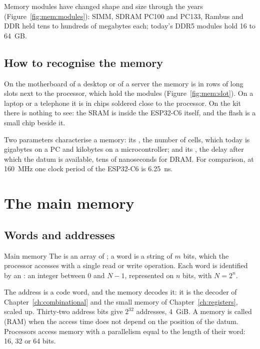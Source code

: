 Memory modules have changed shape and size through the years
(Figure~\ref{fig:mem:modules}): SIMM, SDRAM PC100 and PC133, Rambus and DDR
held tens to hundreds of megabytes each; today's DDR5 modules hold 16 to
64~GB.

\subsection{How to recognise the memory}

On the motherboard of a desktop or of a server the memory is in rows of long
slots next to the processor, which hold the modules
(Figure~\ref{fig:mem:slot}). On a laptop or a telephone it is in chips
soldered close to the processor. On the \prg kit there is nothing to see: the
SRAM is inside the ESP32-C6 itself, and the flash is a small chip beside it.

Two parameters characterise a memory: its , the number of cells,
which today is gigabytes on a PC and kilobytes on a microcontroller; and its
, the delay after which the datum is available, tens of
nanoseconds for DRAM. For comparison, at 160~MHz one clock period of the
ESP32-C6 is 6.25~ns.

\section{The main memory}

\subsection{Words and addresses}

\begin{definition}{Main memory}
The  is an array of ; a word is a string of $m$
bits, which the processor accesses with a single read or write operation.
Each word is identified by an : an integer between 0 and $N-1$,
represented on $n$ bits, with $N=2^{n}$.
\end{definition}

The address is a code word, and the memory decodes it: it is the decoder of
Chapter~\ref{ch:combinational} and the small memory of
Chapter~\ref{ch:registers}, scaled up. Thirty-two address bits give $2^{32}$
addresses, 4~GiB. A memory is called  (RAM) when the
access time does not depend on the position of the datum. Processors access
memory with a parallelism equal to the length of their word: 16, 32 or 64
bits.

